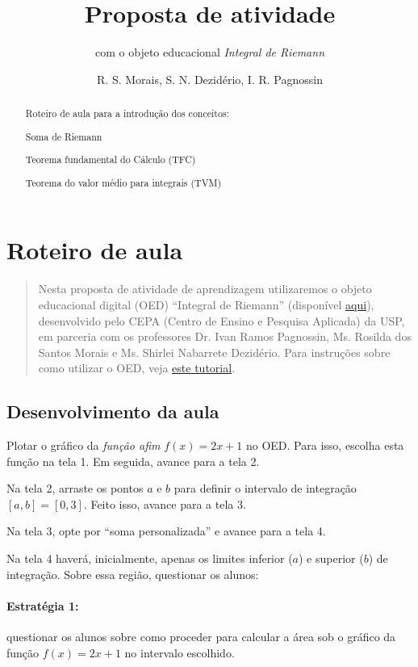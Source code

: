 \documentclass[a4paper,12pt]{scrartcl}
\title{Proposta de atividade}
\subtitle{com o objeto educacional \emph{Integral de Riemann}}
\author{R. S. Morais, S. N. Dezidério, I. R. Pagnossin}
\begin{document}
\maketitle

\begin{abstract}
  Roteiro de aula para a introdução dos conceitos:
  \begin{compactitem}
   \item Soma de Riemann
   \item Teorema fundamental do Cálculo (TFC)
   \item Teorema do valor médio para integrais (TVM)
  \end{compactitem}
\end{abstract}

\section*{Roteiro de aula}

  \begin{quotation}
    Nesta proposta de atividade de aprendizagem utilizaremos o objeto educacional digital (OED) ``Integral de Riemann'' (disponível \href{http://cepa-usp.github.io/AI-0170/}{aqui}), desenvolvido pelo CEPA (Centro de Ensino e Pesquisa Aplicada) da USP, em parceria com os professores Dr. Ivan Ramos Pagnossin, Ms. Rosilda dos Santos Morais e Ms. Shirlei Nabarrete Dezidério. Para instruções sobre como utilizar o OED, veja \href{http://www.youtube.com/watch?v=PJlPleMYuG4&t=22}{este tutorial}.
  \end{quotation}

  \subsection*{Desenvolvimento da aula}

    Plotar o gráfico da \emph{função afim} $f(x) = 2x + 1$ no OED. Para isso, escolha esta função na tela 1. Em seguida, avance para a tela 2.
    
    Na tela 2, arraste os pontos $a$ e $b$ para definir o intervalo de integração $[a,b] = [0,3]$. Feito isso, avance para a tela 3.
    
    Na tela 3, opte por ``soma personalizada'' e avance para a tela 4.
    
    Na tela 4 haverá, inicialmente, apenas os limites inferior ($a$) e superior ($b$) de integração. Sobre essa região, questionar os alunos:
    
      \paragraph{Estratégia 1:} questionar os alunos sobre como proceder para calcular a área sob o gráfico da função $f(x) = 2x + 1$ no intervalo escolhido.
            
\end{document}
